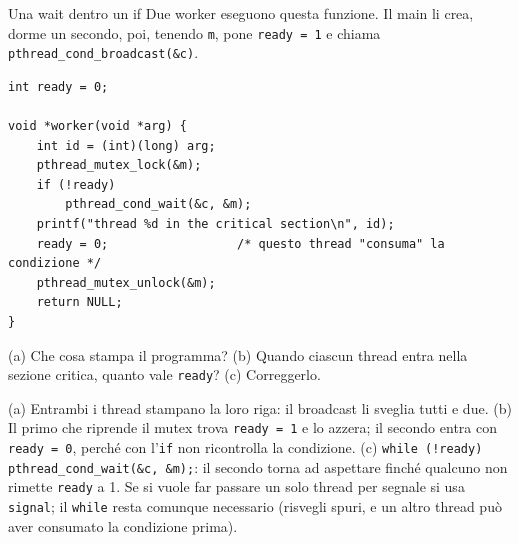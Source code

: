 \begin{esercizio}{Una wait dentro un if}
Due worker eseguono questa funzione. Il main li crea, dorme un secondo, poi, tenendo \texttt{m}, pone \texttt{ready = 1} e chiama
\texttt{pthread\_cond\_broadcast(\&c)}.
\begin{lstlisting}[language={[POSIX]C}]
int ready = 0;

void *worker(void *arg) {
    int id = (int)(long) arg;
    pthread_mutex_lock(&m);
    if (!ready)
        pthread_cond_wait(&c, &m);
    printf("thread %d in the critical section\n", id);
    ready = 0;                  /* questo thread "consuma" la condizione */
    pthread_mutex_unlock(&m);
    return NULL;
}
\end{lstlisting}
(a) Che cosa stampa il programma? (b) Quando ciascun thread entra nella sezione critica, quanto vale \texttt{ready}? (c) Correggerlo.

\svolgimento
(a) Entrambi i thread stampano la loro riga: il broadcast li sveglia tutti e due. (b) Il primo che riprende il mutex trova
\texttt{ready = 1} e lo azzera; il secondo entra con \texttt{ready = 0}, perché con l'\texttt{if} non ricontrolla la condizione. (c)
\texttt{while (!ready) pthread\_cond\_wait(\&c, \&m);}: il secondo torna ad aspettare finché qualcuno non rimette \texttt{ready} a 1. Se si
vuole far passare un solo thread per segnale si usa \texttt{signal}; il \texttt{while} resta comunque necessario (risvegli spuri, e un
altro thread può aver consumato la condizione prima).
\end{esercizio}

